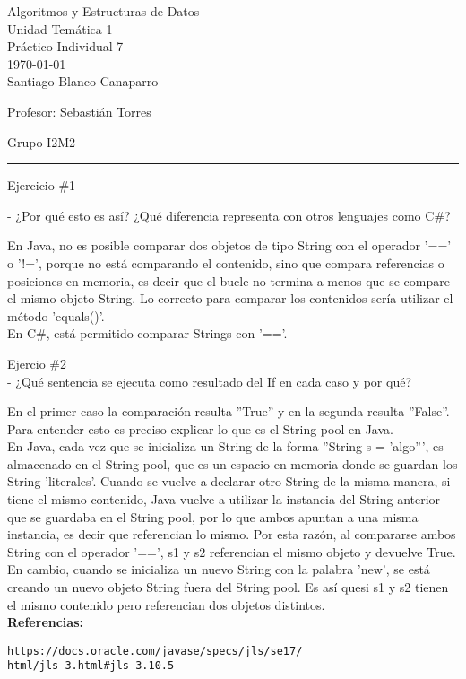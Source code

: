 \documentclass[12pt,letterpaper, onecolumn]{exam}
\begin{document}
\begingroup  
    \centering
    \LARGE Algoritmos y Estructuras de Datos\\
    \large Unidad Temática 1\\
    \large Práctico Individual 7\\[0.5em]
    \normalsize \today\\[0.5em]
    \normalsize Santiago Blanco Canaparro\par
    \normalsize Profesor: Sebastián Torres\par
    \normalsize Grupo I2M2\par
\endgroup
\rule{\textwidth}{0.4pt}
\pointsdroppedatright   %
\printanswers
\renewcommand{\solutiontitle}{\noindent\textbf{Respuesta:}\enspace}   %

\begin{questions}

    \question[] Ejercicio \#1\droppoints
    
    - ¿Por qué esto es así? ¿Qué diferencia representa con otros lenguajes como C\#?
    \begin{solution}
      En Java, no es posible comparar dos objetos de tipo String con el operador '==' o '!=', porque no está comparando el contenido, sino que compara referencias o posiciones en memoria, es decir que el bucle no termina a menos que se compare el mismo objeto String. Lo correcto para comparar los contenidos sería utilizar el método 'equals()'. \\
      En C\#, está permitido comparar Strings con '=='. 
    \end{solution}
    
    \question[] Ejercio \#2\\
- ¿Qué sentencia se ejecuta como resultado del If en cada caso y por qué?
    
       
    \begin{solution}
      En el primer caso la comparación resulta ''True'' y en la segunda resulta ''False''. Para entender esto es preciso explicar lo que es el String pool en Java. \\
  En Java, cada vez que se inicializa un String de la forma ''String s = 'algo''', es almacenado en el String pool, que es un espacio en memoria donde se guardan los String 'literales'. Cuando se vuelve a declarar otro String de la misma manera, si tiene el mismo contenido, Java vuelve a utilizar la instancia del String anterior que se guardaba en el String pool, por lo que ambos apuntan a una misma instancia, es decir que referencian lo mismo. Por esta razón, al compararse ambos String con el operador '==', s1 y s2 referencian el mismo objeto y devuelve True. \\
  En cambio, cuando se inicializa un nuevo String con la palabra 'new', se está creando un nuevo objeto String fuera del String pool. Es así quesi s1 y s2 tienen el mismo contenido pero referencian dos objetos distintos. \\
  \textbf{Referencias:}
  \begin{verbatim}
https://docs.oracle.com/javase/specs/jls/se17/
html/jls-3.html#jls-3.10.5


\end{verbatim}
\end{solution}
\end{questions}
\end{document}
